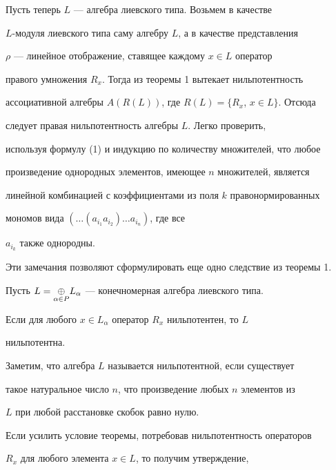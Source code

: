  


Пусть теперь $L$ --- алгебра лиевского типа. Возьмем в качестве 


$L$-модуля лиевского типа саму алгебру $L$, а в качестве представления 


$\rho$ --- линейное отображение, ставящее каждому $x\in L$ оператор 


правого умножения $R_x$. Тогда из теоремы 1 вытекает нильпотентность 


ассоциативной алгебры $A(R(L))$, где $R(L)=\{R_x$, $x\in L\}$. Отсюда 


следует правая нильпотентность алгебры $L$. Легко проверить, 


используя формулу (1) и индукцию по количеству множителей, что любое 


произведение однородных элементов, имеющее $n$ множителей, является 


линейной комбинацией с коэффициентами из поля $k$ правонормированных 


мономов вида $(\dotsc(a_{i_1}a_{i_2})\dotsc a_{i_n})$, где все 


$a_{i_k}$ также однородны. 


 


Эти замечания позволяют сформулировать еще одно следствие из теоремы 1. 


 


\begin{thm} 


Пусть $L=\underset{\alpha\in P}{\oplus}{} L_\alpha$ --- конечномерная алгебра лиевского типа. 


Если для любого $x\in L_\alpha$ оператор $R_x$ нильпотентен, то $L$ 


нильпотентна. 


\end{thm} 


 


Заметим, что алгебра $L$ называется нильпотентной, если существует 


такое натуральное число $n$, что произведение любых $n$ элементов из 


$L$ при любой расстановке скобок равно нулю. 


 


Если усилить условие теоремы, потребовав нильпотентность операторов 


$R_x$ для любого элемента $x\in L$, то получим утверждение, 


